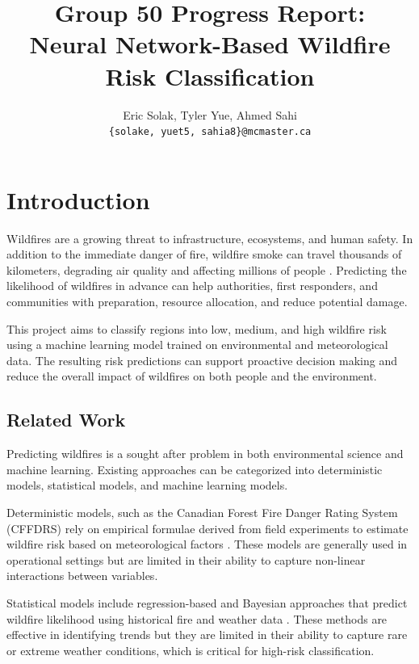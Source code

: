 \documentclass[11pt]{article}
\title{Group 50 Progress Report:\\Neural Network-Based Wildfire Risk Classification}
\author{Eric Solak, Tyler Yue, Ahmed Sahi \\
  \texttt{\{solake, yuet5, sahia8\}@mcmaster.ca} }
\begin{document}
\maketitle

\section{Introduction}

Wildfires are a growing threat to infrastructure, ecosystems, and human safety. In addition to the immediate danger of fire, wildfire smoke can travel thousands of kilometers, degrading air quality and affecting
millions of people \citet{NASAwildfires}. Predicting the likelihood of wildfires in advance can help authorities, first responders, and communities with preparation, resource allocation, and reduce potential damage.

This project aims to classify regions into low, medium, and high wildfire risk using a machine learning model trained on environmental and meteorological data. The resulting risk predictions can support proactive
decision making and reduce the overall impact of wildfires on both people and the environment.

\subsection{Related Work}

Predicting wildfires is a sought after problem in both environmental science and machine learning. Existing approaches can be categorized into deterministic models, statistical models, and machine learning models.

Deterministic models, such as the Canadian Forest Fire Danger Rating System (CFFDRS) rely on empirical formulae derived from field experiments to estimate wildfire risk based on meteorological factors \citet{cffdrs}. These models are
generally used in operational settings but are limited in their ability to capture non-linear interactions between variables.

Statistical models include regression-based and Bayesian approaches that predict wildfire likelihood using historical fire and weather data \citet{statisticalregression2024, bayesian2019}. These methods are effective in identifying trends but they are limited in
their ability to capture rare or extreme weather conditions, which is critical for high-risk classification.
\end{document}
